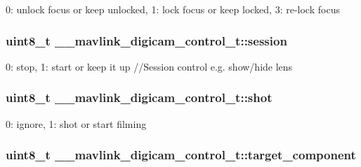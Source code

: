 0\+: unlock focus or keep unlocked, 1\+: lock focus or keep locked, 3\+: re-\/lock focus 

\hypertarget{struct____mavlink__digicam__control__t_aee93a31e833bd6e67a650fc9c4cbbcb3}{
\subsubsection[{session}]{\setlength{\rightskip}{0pt plus 5cm}uint8\+\_\+t \+\_\+\+\_\+mavlink\+\_\+digicam\+\_\+control\+\_\+t\+::session}}\label{struct____mavlink__digicam__control__t_aee93a31e833bd6e67a650fc9c4cbbcb3}


0\+: stop, 1\+: start or keep it up //\+Session control e.\+g. show/hide lens 

\hypertarget{struct____mavlink__digicam__control__t_ad0b5241aa056e7ead65e22d8837006e7}{
\subsubsection[{shot}]{\setlength{\rightskip}{0pt plus 5cm}uint8\+\_\+t \+\_\+\+\_\+mavlink\+\_\+digicam\+\_\+control\+\_\+t\+::shot}}\label{struct____mavlink__digicam__control__t_ad0b5241aa056e7ead65e22d8837006e7}


0\+: ignore, 1\+: shot or start filming 

\hypertarget{struct____mavlink__digicam__control__t_a9d1f15c5844ba5571b3836e0db2e01da}{
\subsubsection[{target\+\_\+component}]{\setlength{\rightskip}{0pt plus 5cm}uint8\+\_\+t \+\_\+\+\_\+mavlink\+\_\+digicam\+\_\+control\+\_\+t\+::target\+\_\+component}}\label{struct____mavlink__digicam__control__t_a9d1f15c5844ba5571b3836e0db2e01da}


